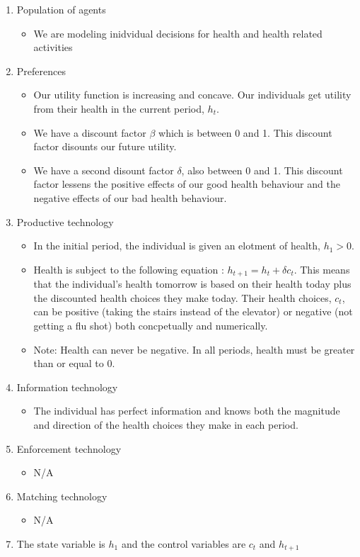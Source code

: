 \documentclass{article}[12pt]
\begin{document}
\begin{enumerate}
    \item Population of agents
    \begin{itemize}
        \item We are modeling inidvidual decisions for health and health related activities
    \end{itemize}
    \item Preferences
    \begin{itemize}
        \item Our utility function is increasing and concave.  Our individuals get utility from their health in the current period, $h_t$.
        \item We have a discount factor $\beta$ which is between 0 and 1.  This discount factor disounts our future utility.
        \item We have a second disount factor $\delta$, also between 0 and 1.  This discount factor lessens the positive effects of our good health behaviour and the negative effects of our bad health behaviour.
    \end{itemize}
    \item Productive technology
    \begin{itemize}
        \item In the initial period, the individual is given an elotment of health, $h_1 > 0$.
        \item Health is subject to the following equation : $h_{t+1} = h_t + \delta c_t$.  This means that the individual's health tomorrow is based on their health today plus the discounted health choices they make today.  Their health choices, $c_t$, can be positive (taking the stairs instead of the elevator) or negative (not getting a flu shot) both concpetually and numerically.
        \item Note: Health can never be negative.  In all periods, health must be greater than or equal to 0.
    \end{itemize}
    \item Information technology
    \begin{itemize}
        \item The individual has perfect information and knows both the magnitude and direction of the health choices they make in each period.
    \end{itemize} \pagebreak
    \item Enforcement technology
    \begin{itemize}
        \item N/A
    \end{itemize}
    \item Matching technology
    \begin{itemize}
        \item N/A
    \end{itemize}
    \item The state variable is $h_1$ and the control variables are $c_t$ and $h_{t+1}$
\end{enumerate}
\end{document}
